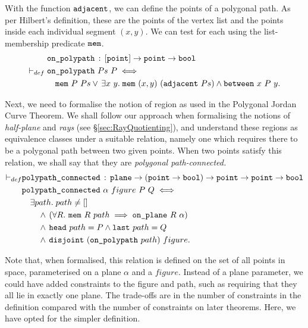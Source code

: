 With the function $\texttt{adjacent}$, we can define the points of a polygonal path. As per Hilbert's definition, these are the points of the vertex list and the points inside each individual segment $(x,y)$. We can test for each using the list-membership predicate $\texttt{mem}$.
\begin{equation}\label{eq:OnPolyPath}
  \begin{split}
    &\code{on\_polypath}\,:\,[\code{point}] \rightarrow \code{point} \rightarrow \code{bool}\\
    \vdash_{def}\;&\code{on\_polypath}\ Ps\ P \iff \\
    &\quad\code{mem}\ P\ Ps\vee\,\exists x\ y.\; \code{mem}\ (x,y)\ (\code{adjacent}\ Ps) \wedge \between{x}{P}{y}.
  \end{split}
\end{equation}

Next, we need to formalise the notion of region as used in the Polygonal Jordan Curve Theorem. We shall follow our approach when formalising the notions of \emph{half-plane} and \emph{rays} (see \S\ref{sec:RayQuotienting}), and understand these regions as equivalence classes under a suitable relation, namely one which requires there to be a polygonal path between two given points. When two points satisfy this relation, we shall say that they are \emph{polygonal path-connected.}
\begin{align*}
  \vdash_{def}&\code{polypath\_connected}\,:\,\code{plane}\rightarrow(\code{point} \rightarrow \code{bool}) \rightarrow \code{point} \rightarrow \code{point} \rightarrow \code{bool}\\
  &\code{polypath\_connected}\ \alpha\ figure\ P\ Q \iff\\
  &\quad\exists path.\; path \neq []\\
  &\qquad\wedge\,(\forall R.\ \code{mem}\ R\ path \implies \onplane{R}{\alpha})\\
  &\qquad\wedge\,\code{head}\ path = P \wedge \code{last}\ path = Q\\
  &\qquad\wedge\,\code{disjoint}\ (\code{on\_polypath}\ path)\ figure.
\end{align*}

Note that, when formalised, this relation is defined on the set of all points in space, parameterised on a plane $\alpha$ and a $figure$. Instead of a plane parameter, we could have added constraints to the figure and path, such as requiring that they all lie in exactly one plane. The trade-offs are in the number of constraints in the definition compared with the number of constraints on later theorems. Here, we have opted for the simpler definition.

